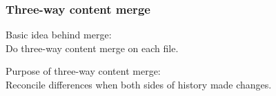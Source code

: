\documentclass[compress,t]{beamer}
\begin{document}
\begin{frame}
  \frametitle{Three-way content merge}

  \begin{center}
  \vfill
  \begin{minipage}{0.6\textwidth}
  \begin{center}
  Basic idea behind merge:\\
  Do three-way content merge on each file.
  \end{center}
  \end{minipage}

  \vfill
  \pause
  \begin{minipage}{0.6\textwidth}
  \begin{center}
  Purpose of three-way content merge:\\
  Reconcile differences when both sides
  of history made changes.
  \end{center}
  \end{minipage}

  \vfill
  \end{center}

\end{frame}

\end{document}
